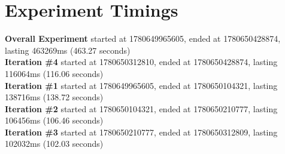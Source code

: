 \documentclass{article}
\begin{document}
\section*{Experiment Timings}
\textbf{Overall Experiment} started at 1780649965605, ended at 1780650428874, lasting 463269ms (463.27 seconds)
\\\textbf{Iteration \#4} started at 1780650312810, ended at 1780650428874, lasting 116064ms (116.06 seconds)
\\\textbf{Iteration \#1} started at 1780649965605, ended at 1780650104321, lasting 138716ms (138.72 seconds)
\\\textbf{Iteration \#2} started at 1780650104321, ended at 1780650210777, lasting 106456ms (106.46 seconds)
\\\textbf{Iteration \#3} started at 1780650210777, ended at 1780650312809, lasting 102032ms (102.03 seconds)
\end{document}
